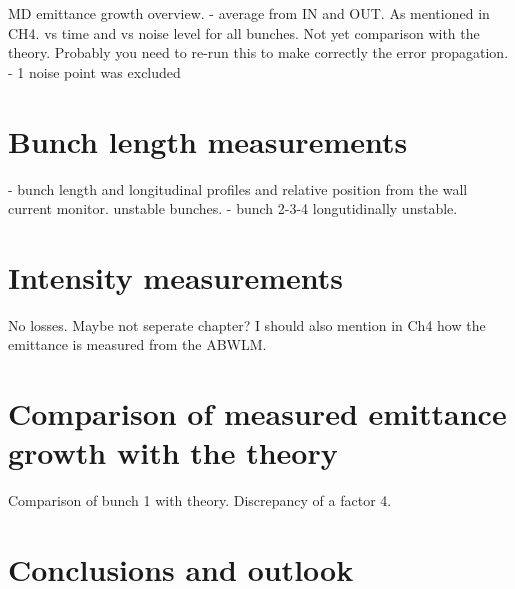 MD emittance growth overview. 
    - average from IN and OUT. As mentioned in CH4. vs time and vs noise level for all bunches. Not yet comparison with the theory. Probably you need to re-run this to make correctly the error propagation. 
    - 1 noise point was excluded
 


\section{Bunch length measurements}\label{sec:bunch_length_measurements_2018}
    - bunch length and longitudinal profiles and relative position from the wall current monitor.  unstable bunches.
    - bunch 2-3-4 longutidinally unstable.
 
\section{Intensity measurements}\label{sec:intensity_measurements_2018}
No losses. Maybe not seperate chapter?
I should also mention in Ch4 how the emittance is measured from the ABWLM.

\section{Comparison of measured emittance growth with the theory}\label{sec:meas_2018_vs_theory}

Comparison of bunch 1 with theory. Discrepancy of a factor 4.


 \section{Conclusions and outlook}\label{sec:MD2018_summary}
